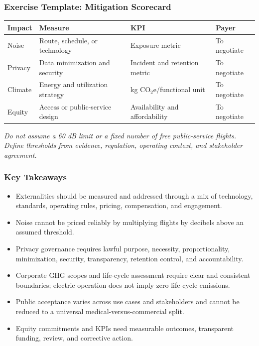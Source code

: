\documentclass{beamer}
\begin{document}
\begin{frame}[t]
\frametitle{Exercise Template: Mitigation Scorecard}
\begin{center}\small
\begin{tabular}{l|l|l|l}
\textbf{Impact} & \textbf{Measure} & \textbf{KPI} & \textbf{Payer}\\
\hline
Noise & Route, schedule, or technology & Exposure metric & To negotiate\\
Privacy & Data minimization and security & Incident and retention metric & To negotiate\\
Climate & Energy and utilization strategy & kg $\mathrm{CO_2e}$/functional unit & To negotiate\\
Equity & Access or public-service design & Availability and affordability & To negotiate\\
\end{tabular}
\end{center}
\vspace{0.3cm}
\textit{Do not assume a 60 dB limit or a fixed number of free public-service flights. Define thresholds from evidence, regulation, operating context, and stakeholder agreement.}
\end{frame}

\begin{frame}[t]
\frametitle{Key Takeaways}
\begin{itemize}
\item Externalities should be measured and addressed through a mix of technology, standards, operating rules, pricing, compensation, and engagement.
\item Noise cannot be priced reliably by multiplying flights by decibels above an assumed threshold.
\item Privacy governance requires lawful purpose, necessity, proportionality, minimization, security, transparency, retention control, and accountability.
\item Corporate GHG scopes and life-cycle assessment require clear and consistent boundaries; electric operation does not imply zero life-cycle emissions.
\item Public acceptance varies across use cases and stakeholders and cannot be reduced to a universal medical-versus-commercial split.
\item Equity commitments and KPIs need measurable outcomes, transparent funding, review, and corrective action.
\end{itemize}
\end{frame}
\end{document}
